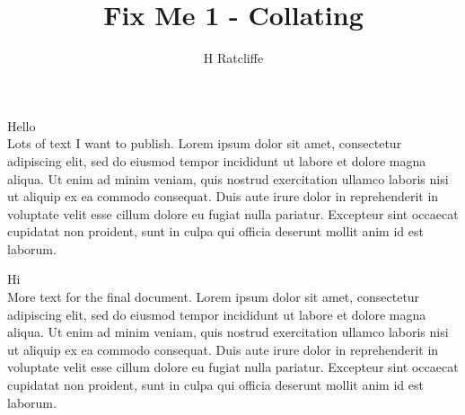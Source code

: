 \documentclass[12pt]{article}
\title{Fix Me 1 - Collating}
\author{H Ratcliffe}
\begin{document}
\maketitle

\newcommand{\hello}{Hello\\}

\hello
Lots of text I want to publish. Lorem ipsum dolor sit amet, consectetur adipiscing elit, sed do eiusmod tempor incididunt ut labore et dolore magna aliqua. Ut enim ad minim veniam, quis nostrud exercitation ullamco laboris nisi ut aliquip ex ea commodo consequat. Duis aute irure dolor in reprehenderit in voluptate velit esse cillum dolore eu fugiat nulla pariatur. Excepteur sint occaecat cupidatat non proident, sunt in culpa qui officia deserunt mollit anim id est laborum.

\renewcommand{\hello}{Hi\\}
\hello
More text for the final document. Lorem ipsum dolor sit amet, consectetur adipiscing elit, sed do eiusmod tempor incididunt ut labore et dolore magna aliqua. Ut enim ad minim veniam, quis nostrud exercitation ullamco laboris nisi ut aliquip ex ea commodo consequat. Duis aute irure dolor in reprehenderit in voluptate velit esse cillum dolore eu fugiat nulla pariatur. Excepteur sint occaecat cupidatat non proident, sunt in culpa qui officia deserunt mollit anim id est laborum.
\end{document}
